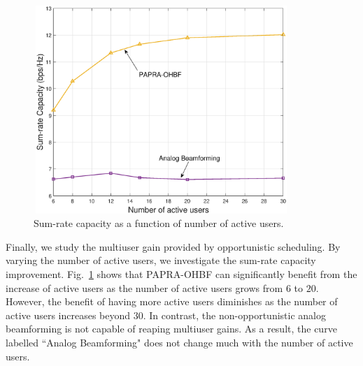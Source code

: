 \documentclass[conference]{IEEEtran}
\begin{document}
\begin{figure}[ht]
	\begin{center}
		\includegraphics[width=3.8in,height=3.1in]{Figure/MultiuserGain2.eps}
		\caption{Sum-rate capacity as a function of number of active users.}\label{fig:MultiuserGain}
	\end{center}
\end{figure}


Finally, we study the multiuser gain provided by opportunistic scheduling. By varying the number of active users, we investigate the sum-rate capacity improvement. Fig.~\ref{fig:MultiuserGain} shows that PAPRA-OHBF can significantly benefit from the increase of active users as the number of active users grows from $6$ to $20$. However, the benefit of having more active users diminishes as the number of active users increases beyond $30$. In contrast, the non-opportunistic analog beamforming is not capable of reaping multiuser gains. As a result, the curve labelled ``Analog Beamforming" does not change much with the number of active users.
\end{document}
